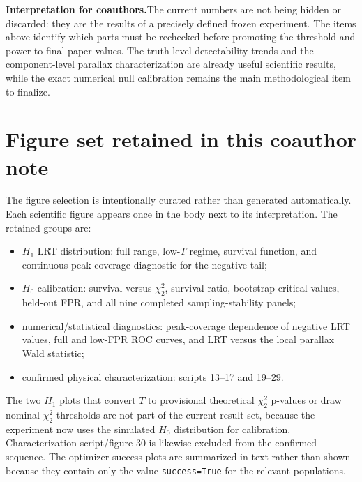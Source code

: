 \documentclass[11pt,a4paper]{article}
\newcommand{\Hnull}{H_0}
\newcommand{\Halt}{H_1}
\newcommand{\statusbox}[2]{%
  \par\medskip
  \noindent\colorbox{gray!10}{%
    \parbox{0.96\linewidth}{\textbf{#1}\quad #2}%
  }%
  \par\medskip
}
\begin{document}
\statusbox{Interpretation for coauthors.}{The current numbers are not being hidden or discarded:
they are the results of a precisely defined frozen experiment.  The items above identify which
parts must be rechecked before promoting the threshold and power to final paper values.  The
truth-level detectability trends and the component-level parallax characterization are already
useful scientific results, while the exact numerical null calibration remains the main
methodological item to finalize.}

\section{Figure set retained in this coauthor note}

The figure selection is intentionally curated rather than generated automatically.  Each
scientific figure appears once in the body next to its interpretation.  The retained groups
are:
\begin{itemize}[leftmargin=2em]
    \item $\Halt$ LRT distribution: full range, low-$T$ regime, survival function, and
    continuous peak-coverage diagnostic for the negative tail;
    \item $\Hnull$ calibration: survival versus $\chi^2_2$, survival ratio, bootstrap critical
    values, held-out FPR, and all nine completed sampling-stability panels;
    \item numerical/statistical diagnostics: peak-coverage dependence of negative LRT values,
    full and low-FPR ROC curves, and LRT versus the local parallax Wald statistic;
    \item confirmed physical characterization: scripts 13--17 and 19--29.
\end{itemize}

The two $\Halt$ plots that convert $T$ to provisional theoretical $\chi^2_2$ p-values or draw
nominal $\chi^2_2$ thresholds are not part of the current result set, because the experiment now
uses the simulated $\Hnull$ distribution for calibration.  Characterization script/figure 30
is likewise excluded from the confirmed sequence.  The optimizer-success plots are summarized
in text rather than shown because they contain only the value \texttt{success=True} for the
relevant populations.

\end{document}
